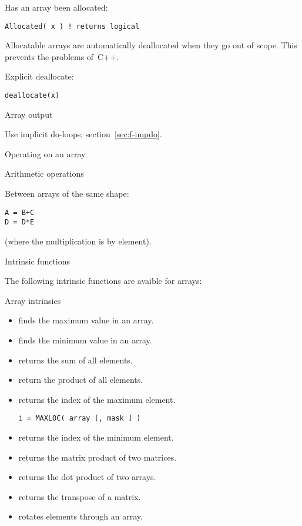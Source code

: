 Has an array been allocated:
\begin{lstlisting}
Allocated( x ) ! returns logical
\end{lstlisting}

Allocatable arrays are automatically deallocated when they go out of
scope. This prevents the  problems of~C++.

Explicit deallocate:
\begin{lstlisting}
deallocate(x)
\end{lstlisting}

 {Array output}

Use implicit do-loops; section~\ref{sec:f-impdo}.

 {Operating on an array}

 {Arithmetic operations}

Between arrays of the same shape:
\begin{lstlisting}
A = B+C
D = D*E
\end{lstlisting}
(where the multiplication is by element).

 {Intrinsic functions}

The following intrinsic functions are avaible for arrays:
\begin{block}{Array intrinsics}
  \label{sl:array-funcf}
  \begin{itemize}
  \item {} finds the maximum value in an array.
  \item {} finds the minimum value in an array.
  \item {} returns the sum of all elements.
  \item {} return the product of all elements.
  \item {} returns the index of the maximum
    element.
\begin{lstlisting}
i = MAXLOC( array [, mask ] )
\end{lstlisting}
  \item {} returns the index of the minimum element.
  \item {} returns the matrix product of two matrices.
  \item {} returns the dot product of two
    arrays.
  \item {} returns the transpose of a matrix.
  \item {} rotates elements through an array.
  \end{itemize}
\end{block}

